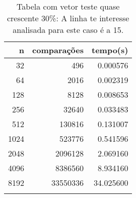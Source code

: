 \begin{table}[ht]
\centering
\begin{tabular}{rrr} \toprule
        n &    comparações &       tempo(s) \\ \midrule
      32  &            496 &      0.000576 \\
      64  &           2016 &      0.002319 \\
     128  &           8128 &      0.008653 \\
     256  &          32640 &      0.033483 \\
     512  &         130816 &      0.131007 \\
    1024  &         523776 &      0.541596 \\
    2048  &        2096128 &      2.069160 \\
    4096  &        8386560 &      8.934160 \\
    8192  &       33550336 &     34.025600 \\
\bottomrule\addlinespace
\end{tabular}
\caption{Tabela com vetor teste quase crescente 30\%: A linha te interesse analisada para este caso é a 15.}
\label{tab:selectionsortQuaseCresc30}
\end{table}
